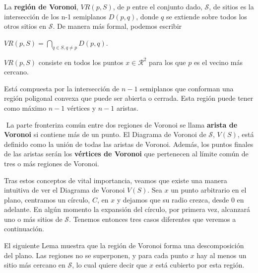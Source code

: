 \begin{definicion}
La \textbf{región de Voronoi}, $VR(p,S)$, de $p$ entre el conjunto dado, $\mathcal{S}$, de sitios es la intersección de los n-1 semiplanos $D(p, q)$, donde $q$ se extiende sobre todos los otros sitios en $\mathcal{S}$. De manera más formal, podemos escribir

\begin{center} $VR(p,S) =  \displaystyle\bigcap_{q \in S, q \neq p}{D(p,q)}$. \end{center}

$VR(p,S)$ consiste en todos los puntos $x \in \mathcal{R}^{2}$ para los que $p$ es el vecino más cercano.

Está compuesta por la intersección de $n-1$ semiplanos que conforman una región poligonal convexa que puede ser abierta o cerrada. Esta región puede tener como máximo $n-1$ vértices y $n-1$ aristas.

\end{definicion}
\vspace{0.3cm}

\begin{definicion} $\label{3.8}$
    La parte fronteriza común entre dos regiones de Voronoi se llama \textbf{arista de Voronoi} si contiene más de un punto. 
    El Diagrama de Voronoi de $\mathcal{S}$, $V(S)$, está definido como la unión de todas las aristas de Voronoi. Además, los puntos finales de las aristas serán los \textbf{vértices de Voronoi} que pertenecen al límite común de tres o más regiones de Voronoi.
\end{definicion}
\vspace{0.3cm}

Tras estos conceptos de vital importancia, veamos que existe una manera intuitiva de ver el Diagrama de Voronoi $V(S)$. Sea $x$ un punto arbitrario en el plano, centramos un círculo, $C$, en $x$ y dejamos que su radio crezca, desde 0 en adelante. En algún momento la expansión del círculo, por primera vez, alcanzará uno o más sitios de $\mathcal{S}$. Tenemos entonces tres casos diferentes que veremos a continuación.

El siguiente Lema muestra que la región de Voronoi forma una descomposición del plano. Las regiones no se superponen, y para cada punto $x$ hay al menos un sitio más cercano en $\mathcal{S}$, lo cual quiere decir que $x$ está cubierto por esta región.

